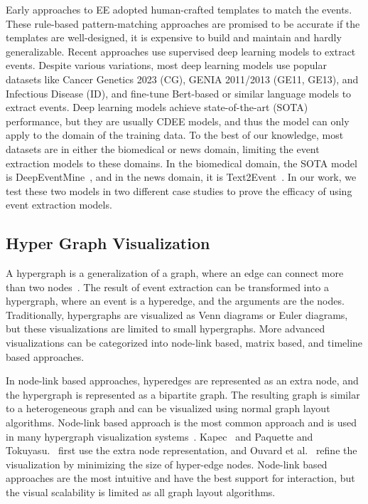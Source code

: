 Early approaches to EE adopted human-crafted templates to match the events.
These rule-based pattern-matching approaches are promised to be accurate if the templates are well-designed, it is expensive to build and maintain and hardly generalizable.
Recent approaches use supervised deep learning models to extract events.
Despite various variations, most deep learning models use popular datasets like Cancer Genetics 2023 (CG), GENIA 2011/2013 (GE11, GE13), and Infectious Disease (ID),
and fine-tune Bert-based or similar language models to extract events.
Deep learning models achieve state-of-the-art (SOTA) performance, but they are usually CDEE models, and thus the model can only apply to the domain of the training data.
To the best of our knowledge, most datasets are in either the biomedical or news domain, limiting the event extraction models to these domains.
In the biomedical domain, the SOTA model is DeepEventMine~\cite{trieu2020deepeventmine}, and in the news domain, it is Text2Event~\cite{lu2021text2event}.
In our work, we test these two models in two different case studies to prove the efficacy of using event extraction models.

\subsection{Hyper Graph Visualization}
A hypergraph is a generalization of a graph, where an edge can connect more than two nodes~\cite{fischer2021hypergraphsurvey}.
The result of event extraction can be transformed into a hypergraph, where an event is a hyperedge, and the arguments are the nodes.
Traditionally, hypergraphs are visualized as Venn diagrams or Euler diagrams, but these visualizations are limited to small hypergraphs.
More advanced visualizations can be categorized into node-link based, matrix based, and timeline based approaches.

In node-link based approaches, hyperedges are represented as an extra node, and the hypergraph is represented as a bipartite graph.
The resulting graph is similar to a heterogeneous graph and can be visualized using normal graph layout algorithms.
Node-link based approach is the most common approach and is used in many hypergraph visualization systems~\cite{kapec2010visualizing, paquette2011hypergraph, kerren2013radial, ouvrard2017networks, jacobsen2020metrosets}.
Kapec~\cite{kapec2010visualizing} and Paquette and Tokuyasu.~\cite{paquette2011hypergraph} first use the extra node representation, 
and Ouvard et al.~\cite{ouvrard2017networks} refine the visualization by minimizing the size of hyper-edge nodes.
Node-link based approaches are the most intuitive and have the best support for interaction, but the visual scalability is limited as all graph layout algorithms.

